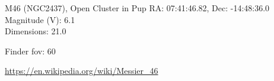 \begin{block}{M46 (NGC2437), Open Cluster in Pup}
    RA: 07:41:46.82, Dec: -14:48:36.0 \\ 
    Magnitude (V): 6.1 \\ 
    Dimensions: 21.0 

    Finder fov: 60 

    \url{https://en.wikipedia.org/wiki/Messier_46} 
\end{block}
